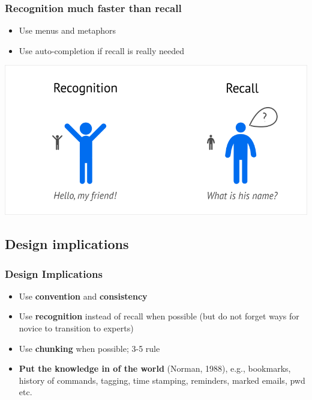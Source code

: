 \documentclass{beamer}
\begin{document}
\begin{frame}
	\frametitle{Recognition much faster than recall}
	\begin{itemize}
		\item Use menus and metaphors
		\item Use auto-completion if recall is really needed
	\end{itemize}
	\centering
	\includegraphics[width=0.8\linewidth]{image/recognition}
\end{frame}

\subsection{Design implications}

\begin{frame}
	\frametitle{Design Implications}
		\begin{itemize}
			\item Use \textbf{convention} and \textbf{consistency}
			\item Use \textbf{recognition} instead of recall when possible (but do not forget ways for novice to transition to experts)
			\item Use \textbf{chunking} when possible; 3-5 rule
			\item \textbf{Put the knowledge in of the world} (Norman, 1988), e.g.,  bookmarks, history of commands, tagging, time stamping, reminders, marked emails, pwd etc.
		\end{itemize}
\end{frame}
\end{document}
